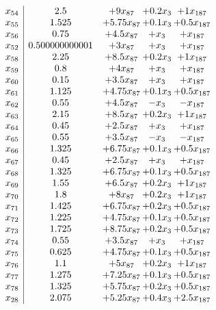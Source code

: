\documentclass[11pt]{article}
\begin{document}
\[\begin{array}{c| c c@{\hskip 2pt} c@{\hskip 2pt} c@{\hskip 2pt} }
 x_{54}   &  2.5 & + 9 x_{87} & + 0.2 x_{3} & + 1 x_{187}\\
 x_{55}   &  1.525 & + 5.75 x_{87} & + 0.1 x_{3} & + 0.5 x_{187}\\
 x_{56}   &  0.75 & + 4.5 x_{87} & +  x_{3} & +  x_{187}\\
 x_{52}   &  0.500000000001 & + 3 x_{87} & +  x_{3} & +  x_{187}\\
 x_{58}   &  2.25 & + 8.5 x_{87} & + 0.2 x_{3} & + 1 x_{187}\\
 x_{59}   &  0.8 & + 4 x_{87} & +  x_{3} & +  x_{187}\\
 x_{60}   &  0.15 & + 3.5 x_{87} & +  x_{3} & +  x_{187}\\
 x_{61}   &  1.125 & + 4.75 x_{87} & + 0.1 x_{3} & + 0.5 x_{187}\\
 x_{62}   &  0.55 & + 4.5 x_{87} & - x_{3} & - x_{187}\\
 x_{63}   &  2.15 & + 8.5 x_{87} & + 0.2 x_{3} & + 1 x_{187}\\
 x_{64}   &  0.45 & + 2.5 x_{87} & +  x_{3} & +  x_{187}\\
 x_{65}   &  0.55 & + 3.5 x_{87} & - x_{3} & - x_{187}\\
 x_{66}   &  1.325 & + 6.75 x_{87} & + 0.1 x_{3} & + 0.5 x_{187}\\
 x_{67}   &  0.45 & + 2.5 x_{87} & +  x_{3} & +  x_{187}\\
 x_{68}   &  1.325 & + 6.75 x_{87} & + 0.1 x_{3} & + 0.5 x_{187}\\
 x_{69}   &  1.55 & + 6.5 x_{87} & + 0.2 x_{3} & + 1 x_{187}\\
 x_{70}   &  1.8 & + 8 x_{87} & + 0.2 x_{3} & + 1 x_{187}\\
 x_{71}   &  1.425 & + 6.75 x_{87} & + 0.2 x_{3} & + 0.5 x_{187}\\
 x_{72}   &  1.225 & + 4.75 x_{87} & + 0.1 x_{3} & + 0.5 x_{187}\\
 x_{73}   &  1.725 & + 8.75 x_{87} & + 0.2 x_{3} & + 0.5 x_{187}\\
 x_{74}   &  0.55 & + 3.5 x_{87} & +  x_{3} & +  x_{187}\\
 x_{75}   &  0.625 & + 4.75 x_{87} & + 0.1 x_{3} & + 0.5 x_{187}\\
 x_{76}   &  1.1 & + 5 x_{87} & + 0.2 x_{3} & + 1 x_{187}\\
 x_{77}   &  1.275 & + 7.25 x_{87} & + 0.1 x_{3} & + 0.5 x_{187}\\
 x_{78}   &  1.325 & + 5.75 x_{87} & + 0.2 x_{3} & + 0.5 x_{187}\\
 x_{28}   &  2.075 & + 5.25 x_{87} & + 0.4 x_{3} & + 2.5 x_{187}\\

\end{array}\]
\end{document}
